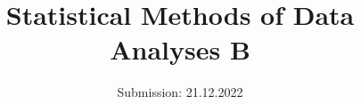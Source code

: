 

\subject{Sheet 8}
\title{Statistical Methods of Data Analyses B}
\date{
  Submission: 21.12.2022
}


\maketitle


\newpage





